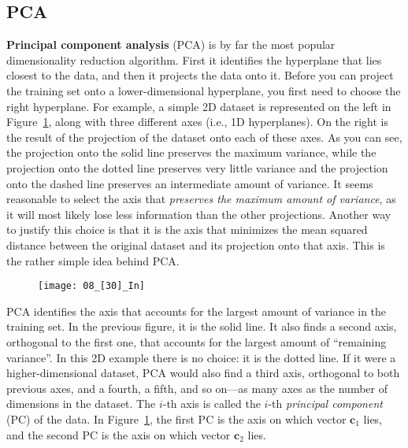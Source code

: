 \subsection{PCA}
\textbf{Principal component analysis} (PCA) is by far the most popular dimensionality reduction algorithm. First it identifies the hyperplane that lies closest to the data, and then it projects the data onto it. Before you can project the training set onto a lower-dimensional hyperplane, you first need to choose the right hyperplane. For example, a simple 2D dataset is represented on the left in Figure~\ref{08_[30]_In}, along with three different axes (i.e., 1D hyperplanes). On the right is the result of the projection of the dataset onto each of these axes. As you can see, the projection onto the solid line preserves the maximum variance, while the projection onto the dotted line preserves very little variance and the projection onto the dashed line preserves an intermediate amount of variance.
It seems reasonable to select the axis that \emph{preserves the maximum amount of variance}, as it will most likely lose less information than the other projections. Another way to justify this choice is that it is the axis that minimizes the mean squared distance between the original dataset and its projection onto that axis. This is the rather simple idea behind PCA.
\begin{figure}[h!t]
\centering
\texttt{[image: 08\_[30]\_In]}
\caption{}\label{08_[30]_In}
\end{figure}

PCA identifies the axis that accounts for the largest amount of variance in the training set. In the previous figure, it is the solid line. It also finds a second axis, orthogonal to the first one, that accounts for the largest amount of ``remaining variance''. In this 2D example there is no choice: it is the dotted line. If it were a higher-dimensional dataset, PCA would also find a third axis, orthogonal to both previous axes, and a fourth, a fifth, and so on—as many axes as the number of dimensions in the dataset. The $i$-th axis is called the $i$-th \emph{principal component} (PC) of the data. In Figure~\ref{08_[30]_In}, the first PC is the axis on which vector $\mathbf{c}_1$ lies, and the second PC is the axis on which vector $\mathbf{c}_2$ lies.
